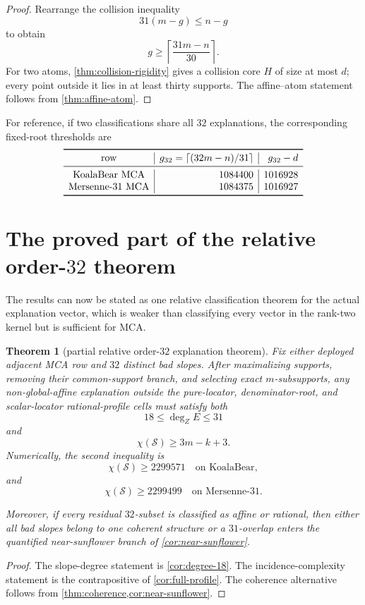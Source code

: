 \documentclass[11pt,a4paper]{amsart}
\numberwithin{equation}{section}
\newtheorem{theorem}{Theorem}[section]
\theoremstyle{remark}
\newcommand{\ceil}[1]{\left\lceil #1\right\rceil}\newcommand{\defeq}{\coloneqq}
\newcommand{\cS}{\mathcal S}\newcommand{\cZ}{\mathcal Z}
\begin{document}
\begin{proof}
Rearrange the collision inequality
\[
 31(m-g)\le n-g
\]
to obtain
\[
 g\ge\ceil{\frac{31m-n}{30}}.
\]
For two atoms, \cref{thm:collision-rigidity} gives a collision core $H$ of size at most $d$; every point outside it lies in at least thirty supports.  The affine--atom statement follows from \cref{thm:affine-atom}.
\end{proof}

For reference, if two classifications share all $32$ explanations, the corresponding fixed-root thresholds are
\[
\begin{array}{c|r|r}
\toprule
\text{row}&g_{32}=\ceil{(32m-n)/31}&g_{32}-d\\
\midrule
\text{KoalaBear MCA}&1084400&1016928\\
\text{Mersenne-31 MCA}&1084375&1016927\\
\bottomrule
\end{array}
\]

\section{The proved part of the relative order-\texorpdfstring{$32$}{32} theorem}

The results can now be stated as one relative classification theorem for the actual explanation vector, which is weaker than classifying every vector in the rank-two kernel but is sufficient for MCA.

\begin{theorem}[partial relative order-\texorpdfstring{$32$}{32} explanation theorem]\label{thm:partial-relative}
Fix either deployed adjacent MCA row and $32$ distinct bad slopes.  After maximalizing supports, removing their common-support branch, and selecting exact $m$-subsupports, any non-global-affine explanation outside the pure-locator, denominator-root, and scalar-locator rational-profile cells must satisfy both
\[
 \boxed{18\le\deg_ZE\le31}
\]
and
\[
 \boxed{\chi(\cS)\ge3m-k+3.}
\]
Numerically, the second inequality is
\[
 \chi(\cS)\ge2299571
 \quad\text{on KoalaBear},
\]
and
\[
 \chi(\cS)\ge2299499
 \quad\text{on Mersenne-31}.
\]

Moreover, if every residual $32$-subset is classified as affine or rational, then either all bad slopes belong to one coherent structure or a $31$-overlap enters the quantified near-sunflower branch of \cref{cor:near-sunflower}.
\end{theorem}

\begin{proof}
The slope-degree statement is \cref{cor:degree-18}.  The incidence-complexity statement is the contrapositive of \cref{cor:full-profile}.  The coherence alternative follows from \cref{thm:coherence,cor:near-sunflower}.
\end{proof}
\end{document}

